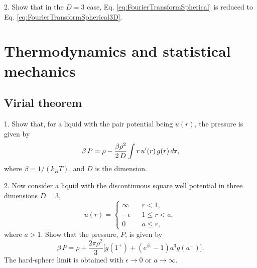 \documentclass{book}
\begin{document}

2. Show that in the $D = 3$ case,
Eq. \eqref{eq:FourierTransformSpherical}
is reduced to
Eq. \eqref{eq:FourierTransformSpherical3D}.




\chapter{Thermodynamics and statistical mechanics}



\section{Virial theorem}




1. Show that, for a liquid with the pair potential being $u(r)$,
the pressure is given by
\begin{equation}
  \beta \, P = \rho - \frac{\beta \rho^2} {2\, D} \int r \, u'(r) \, g(r) \, d\boldsymbol{\mathbf{r}},
\end{equation}
where $\beta = 1/(k_BT)$, and $D$ is the dimension.

2. Now consider a liquid with the discontinuous square well potential
in three dimensions $D = 3$,
\begin{equation}
  u(r) =
  \begin{cases}
    \infty      \quad   & r < 1,          \\
    -\epsilon           & 1 \le r < a,    \\
    0                   & a \le r,
  \end{cases}
\end{equation}
where $a > 1$.
%
Show that the pressure, $P$, is given by
\begin{equation}
  \beta \, P = \rho
            + \frac{2 \pi \rho^2}{3}
              \big[g(1^+)
              + (e^{\beta \epsilon} - 1) a^3 g(a^-)\big].
\end{equation}
%
The hard-sphere limit is obtained with $\epsilon \rightarrow 0$
or $a \rightarrow \infty$.
\end{document}
